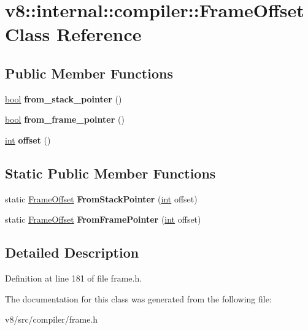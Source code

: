 \hypertarget{classv8_1_1internal_1_1compiler_1_1FrameOffset}{}\section{v8\+:\+:internal\+:\+:compiler\+:\+:Frame\+Offset Class Reference}
\label{classv8_1_1internal_1_1compiler_1_1FrameOffset}
\subsection*{Public Member Functions}
\begin{DoxyCompactItemize}
\item 
\mbox{\label{classv8_1_1internal_1_1compiler_1_1FrameOffset_ada9d69255b15ecc8239260a430fd91f8}} 
\mbox{\hyperlink{classbool}{bool}} {\bfseries from\+\_\+stack\+\_\+pointer} ()
\item 
\mbox{\label{classv8_1_1internal_1_1compiler_1_1FrameOffset_a4e2d1417aae4d286e68596b8d6e36210}} 
\mbox{\hyperlink{classbool}{bool}} {\bfseries from\+\_\+frame\+\_\+pointer} ()
\item 
\mbox{\label{classv8_1_1internal_1_1compiler_1_1FrameOffset_a1a77b35047bbacae6e6e3f118d6ec8ef}} 
\mbox{\hyperlink{classint}{int}} {\bfseries offset} ()
\end{DoxyCompactItemize}
\subsection*{Static Public Member Functions}
\begin{DoxyCompactItemize}
\item 
\mbox{\label{classv8_1_1internal_1_1compiler_1_1FrameOffset_a39ceedec210cbac1511d9545490ef4f5}} 
static \mbox{\hyperlink{classv8_1_1internal_1_1compiler_1_1FrameOffset}{Frame\+Offset}} {\bfseries From\+Stack\+Pointer} (\mbox{\hyperlink{classint}{int}} offset)
\item 
\mbox{\label{classv8_1_1internal_1_1compiler_1_1FrameOffset_a0743a84cbb8fd4dc066ddd3f357b48fa}} 
static \mbox{\hyperlink{classv8_1_1internal_1_1compiler_1_1FrameOffset}{Frame\+Offset}} {\bfseries From\+Frame\+Pointer} (\mbox{\hyperlink{classint}{int}} offset)
\end{DoxyCompactItemize}


\subsection{Detailed Description}


Definition at line 181 of file frame.\+h.



The documentation for this class was generated from the following file\+:\begin{DoxyCompactItemize}
\item 
v8/src/compiler/frame.\+h\end{DoxyCompactItemize}
